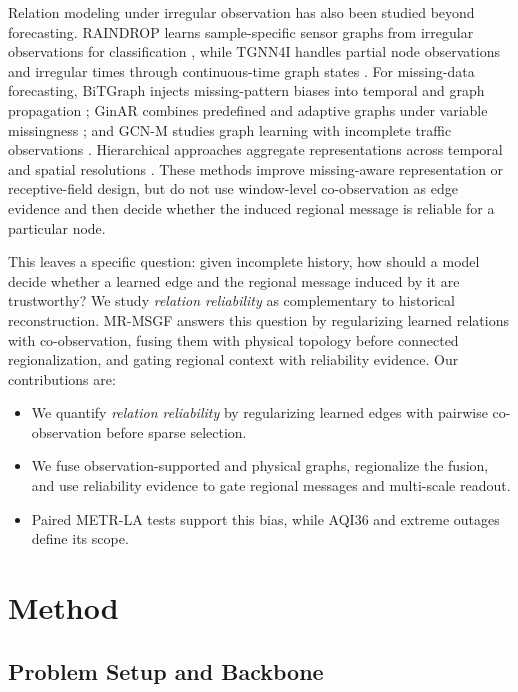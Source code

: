 \documentclass{article}
\begin{document}
Relation modeling under irregular observation has also been studied beyond forecasting. RAINDROP learns sample-specific sensor graphs from irregular observations for classification \cite{raindrop}, while TGNN4I handles partial node observations and irregular times through continuous-time graph states \cite{tgnn4i}. For missing-data forecasting, BiTGraph injects missing-pattern biases into temporal and graph propagation \cite{bitgraph}; GinAR combines predefined and adaptive graphs under variable missingness \cite{ginar}; and GCN-M studies graph learning with incomplete traffic observations \cite{gcnm}. Hierarchical approaches aggregate representations across temporal and spatial resolutions \cite{hdtts,pguts,higp}. These methods improve missing-aware representation or receptive-field design, but do not use window-level co-observation as edge evidence and then decide whether the induced regional message is reliable for a particular node.

This leaves a specific question: given incomplete history, how should a model decide whether a learned edge and the regional message induced by it are trustworthy? We study \emph{relation reliability} as complementary to historical reconstruction. MR-MSGF answers this question by regularizing learned relations with co-observation, fusing them with physical topology before connected regionalization, and gating regional context with reliability evidence. Our contributions are:
\begin{itemize}
    \item We quantify \emph{relation reliability} by regularizing learned edges with pairwise co-observation before sparse selection.
    \item We fuse observation-supported and physical graphs, regionalize the fusion, and use reliability evidence to gate regional messages and multi-scale readout.
    \item Paired METR-LA tests support this bias, while AQI36 and extreme outages define its scope.
\end{itemize}

\section{Method}

\subsection{Problem Setup and Backbone}
\end{document}

